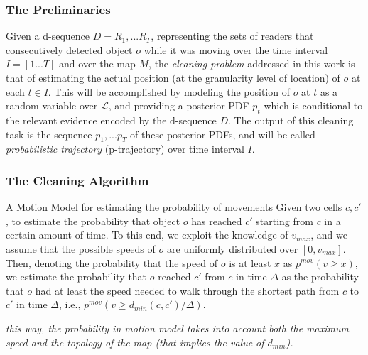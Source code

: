 
\begin{frame}
\frametitle{The Preliminaries}

\begin{problem}
  Given a d-sequence $D = R_1,...R_T$, representing the sets of readers that consecutively detected object $o$ while it was moving over the time interval $I = [1...T]$ and over the map $M$, the \emph{cleaning problem} addressed in this work is that of estimating the actual position (at the granularity level of location) of $o$ at each $t \in I$. This will be accomplished by modeling the position of $o$ at $t$ as a random variable over $\mathcal{L}$, and providing a posterior PDF $p_t$ which is conditional to the relevant evidence encoded by the d-sequence $D$. The output of this cleaning task is the sequence $p_1,...p_T$ of these posterior PDFs, and will be called \emph{probabilistic trajectory} (p-trajectory) over time interval $I$.
\end{problem}

\end{frame}


\begin{frame}
\frametitle{The Cleaning Algorithm}

\begin{block}{A Motion Model for estimating the probability of movements}
  Given two cells $c, c'$, to estimate the probability that object $o$ has reached $c'$ starting from $c$ in a certain amount of time. To this end, we exploit the knowledge of $v_{max}$, and we assume that the possible speeds of $o$ are uniformly distributed over $[0,v_{max}]$. Then, denoting the probability that the speed of $o$ is at least $x$ as $p^{mov}(v \geq x)$, we estimate the probability that $o$ reached $c'$ from $c$ in time $\Delta$ as the probability that $o$ had at least the speed needed to walk through the shortest path from $c$ to $c'$ in time $\Delta$, i.e., $p^{mov} (v \geq d_{min}(c,c')/\Delta)$.
\end{block}

\textit{\textrm{this way, the probability in motion model takes into account both the maximum speed and the topology of the map (that implies the value of $d_{min}$).}}

\end{frame}


